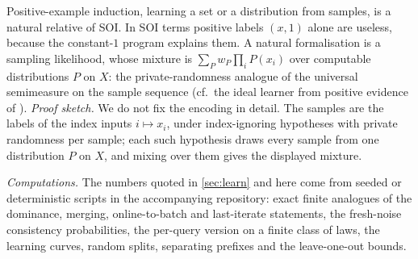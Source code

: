 \begin{remark}\label{rem:learn:positive}
Positive-example induction, learning a set or a distribution from samples, is a natural relative of SOI. In SOI terms positive labels $(x,1)$ alone are useless, because the constant-$1$ program explains them. A natural formalisation is a sampling likelihood, whose mixture is $\sum_Pw_P\prod_iP(x_i)$ over computable distributions $P$ on $X$: the private-randomness analogue of the universal semimeasure on the sample sequence (cf.\ the ideal learner from positive evidence of \citealp{chater2007ideal}).
\emph{Proof sketch.} We do not fix the encoding in detail. The samples are the labels of the index inputs $i\mapsto x_i$, under index-ignoring hypotheses with private randomness per sample; each such hypothesis draws every sample from one distribution $P$ on $X$, and mixing over them gives the displayed mixture.
\end{remark}

\emph{Computations.} The numbers quoted in \cref{sec:learn} and here come from seeded or deterministic scripts in the accompanying repository: exact finite analogues of the dominance, merging, online-to-batch and last-iterate statements, the fresh-noise consistency probabilities, the per-query version on a finite class of laws, the learning curves, random splits, separating prefixes and the leave-one-out bounds.

